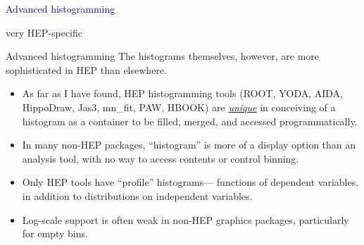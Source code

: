 \documentclass[aspectratio=169]{beamer}
\begin{document}

\begin{frame}{}
\huge
\vspace{0.5 cm}
\begin{center}
\textcolor{darkblue}{Advanced histogramming}

\large
\vspace{0.5 cm}
very HEP-specific
\end{center}
\end{frame}

\begin{frame}{Advanced histogramming}
\large
\vspace{0.5 cm}
{\Large The histograms themselves, however, are more sophisticated in HEP than elsewhere.}
\vspace{0.25 cm}
\begin{itemize}\setlength{\itemsep}{0.25 cm}
\item<2-> As far as I have found, HEP histogramming tools (ROOT, YODA, AIDA, HippoDraw, Jas3, mn\_fit, PAW, HBOOK) are \underline{\it unique} in conceiving of a histogram as a container to be filled, merged, and accessed programmatically.
\item<3-> In many non-HEP packages, ``histogram'' is more of a display option than an analysis tool, with no way to access contents or control binning.
\item<4-> Only HEP tools have ``profile'' histograms--- functions of dependent variables, in addition to distributions on independent variables.
\item<5-> Log-scale support is often weak in non-HEP graphics packages, particularly for empty bins.
\end{itemize}
\begin{center}
\end{center}
\end{frame}
\end{document}
